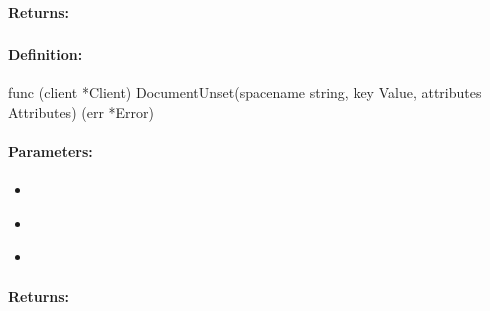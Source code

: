 \paragraph{Returns:}


\pagebreak
\subsubsection{}
\label{api:Go:DocumentUnset}


\paragraph{Definition:}
\begin{gocode}
func (client *Client) DocumentUnset(spacename string, key Value, attributes Attributes) (err *Error)
\end{gocode}

\paragraph{Parameters:}
\begin{itemize}[noitemsep]
\item {}\\

\item {}\\

\item {}\\

\end{itemize}

\paragraph{Returns:}


\pagebreak
\subsubsection{}
\label{api:Go:UxactDocumentUnset}


